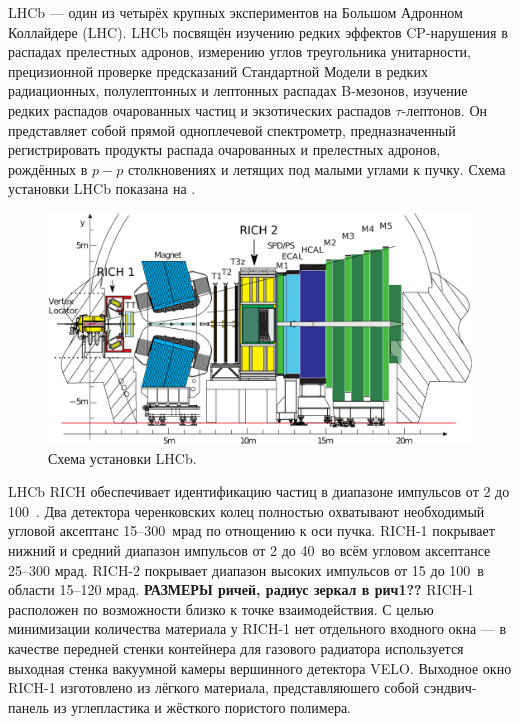 LHCb --- один из четырёх крупных экспериментов на Большом Адронном Коллайдере (LHC). LHCb посвящён изучению редких эффектов CP-нарушения в распадах прелестных адронов, измерению углов треугольника унитарности, прецизионной проверке предсказаний Стандартной Модели в редких радиационных, полулептонных и лептонных распадах B-мезонов, изучение редких распадов очарованных частиц и экзотических распадов $\tau$-лептонов. Он представляет собой прямой одноплечевой спектрометр, предназначенный регистрировать продукты распада очарованных и прелестных адронов, рождённых в $p-p$ столкновениях и летящих под малыми углами к пучку. Схема установки LHCb показана на .


\begin{figure}[H]
\centering
\includegraphics[width=1.0\textwidth]{pictures/LHCb.png}
\caption{Схема установки LHCb.}
\label{fig:LHCb}
\end{figure}

LHCb RICH обеспечивает идентификацию частиц в диапазоне импульсов от 2 до 100~\GeVoverC. Два детектора черенковских колец полностью охватывают необходимый угловой аксептанс 15--300~мрад по отнощению к оси пучка. \mbox{RICH-1} покрывает нижний и средний диапазон импульсов от 2 до 40~\GeVoverC во всём угловом аксептансе 25--300 мрад. \mbox{RICH-2} покрывает диапазон высоких импульсов от 15 до 100~\GeVoverC в области 15--120 мрад.
\todo \textbf{РАЗМЕРЫ ричей, радиус зеркал в рич1??}
\mbox{RICH-1} расположен по возможности близко к точке взаимодействия. С целью минимизации количества материала у \mbox{RICH-1} нет отдельного входного окна --- в качестве передней стенки контейнера для газового радиатора используется выходная стенка вакуумной камеры вершинного детектора VELO. Выходное окно \mbox{RICH-1} изготовлено из лёгкого материала, представляюшего собой сэндвич-панель из углепластика и жёсткого пористого полимера.

